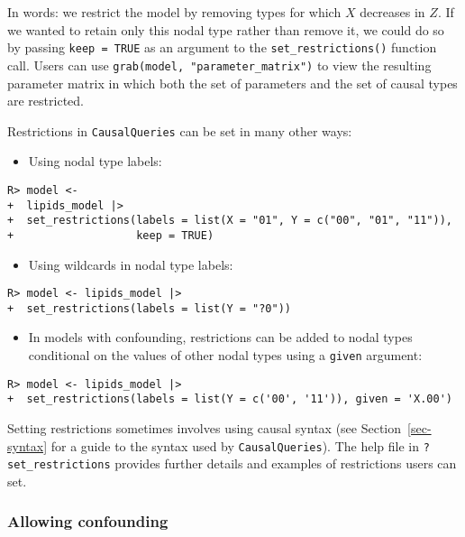\documentclass[
  11pt,
  article]{jss}
\providecommand{\tightlist}{%
  \setlength{\itemsep}{0pt}\setlength{\parskip}{0pt}}\usepackage{longtable,booktabs,array}
\begin{document}
In words: we restrict the model by removing types for which \(X\)
decreases in \(Z\). If we wanted to retain only this nodal type rather
than remove it, we could do so by passing \texttt{keep\ =\ TRUE} as an
argument to the \texttt{set\_restrictions()} function call. Users can
use \texttt{grab(model,\ "parameter\_matrix")} to view the resulting
parameter matrix in which both the set of parameters and the set of
causal types are restricted.

Restrictions in \texttt{CausalQueries} can be set in many other ways:

\begin{itemize}
\tightlist
\item
  Using nodal type labels:
\end{itemize}

\begin{verbatim}
R> model <- 
+  lipids_model |>
+  set_restrictions(labels = list(X = "01", Y = c("00", "01", "11")), 
+                   keep = TRUE)
\end{verbatim}

\begin{itemize}
\tightlist
\item
  Using wildcards in nodal type labels:
\end{itemize}

\begin{verbatim}
R> model <- lipids_model |>
+  set_restrictions(labels = list(Y = "?0"))
\end{verbatim}

\begin{itemize}
\tightlist
\item
  In models with confounding, restrictions can be added to nodal types
  conditional on the values of other nodal types using a \texttt{given}
  argument:
\end{itemize}

\begin{verbatim}
R> model <- lipids_model |>
+  set_restrictions(labels = list(Y = c('00', '11')), given = 'X.00')
\end{verbatim}

Setting restrictions sometimes involves using causal syntax (see
Section~\ref{sec-syntax} for a guide to the syntax used by
\texttt{CausalQueries}). The help file in \texttt{?set\_restrictions}
provides further details and examples of restrictions users can set.

\hypertarget{sec-confounding}{%
\subsubsection{Allowing confounding}\label{sec-confounding}}
\end{document}
